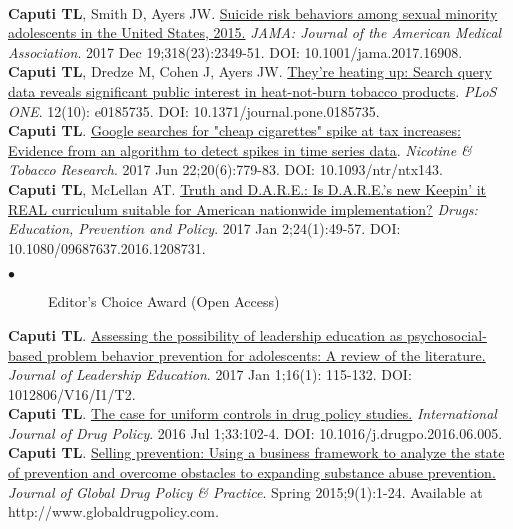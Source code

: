 \documentclass[11pt, letterpaper]{article}
\newcommand{\years}[1]{\marginnote{\normalsize #1}}
\begin{document}
\\[.2cm]
\years{2017}\textbf{Caputi TL}, Smith D, Ayers JW.
\href{http://dx.doi.org/10.1001/jama.2017.16908}{Suicide risk behaviors among sexual minority adolescents in the United States, 2015.} \emph{JAMA: Journal of the American Medical Association}.  2017 Dec 19;318(23):2349-51. DOI: 10.1001/jama.2017.16908.\\[.2cm]
\years{2017}\textbf{Caputi TL}, Dredze M, Cohen J, Ayers JW. \href{http://dx.doi.org/10.1371/journal.pone.0185735}{They’re heating up: Search query data reveals significant public interest in heat-not-burn tobacco products}. \emph{PLoS ONE}. 12(10): e0185735. DOI: 10.1371/journal.pone.0185735.\\[.2cm]
\years{2017}\textbf{Caputi TL}.  \href{http://dx.doi.org/10.1093/ntr/ntx143}{Google searches for "cheap cigarettes" spike at tax increases: Evidence from an algorithm to detect spikes in time series data}. \emph{Nicotine \& Tobacco Research}. 2017 Jun 22;20(6):779-83. DOI: 10.1093/ntr/ntx143.\\[.2cm]
\years{2017}\textbf{Caputi TL}, McLellan AT. \href{http://dx.doi.org/10.1080/09687637.2016.1208731}{Truth and D.A.R.E.: Is D.A.R.E.’s new Keepin’ it REAL curriculum suitable for American nationwide implementation?}  \textit{Drugs: Education, Prevention and Policy}. 2017 Jan 2;24(1):49-57. DOI: 10.1080/09687637.2016.1208731.
    \begin{description}
    \item[$\bullet$] Editor's Choice Award (Open Access)
    \end{description}
\years{2017}\textbf{Caputi TL}. \href{http://journalofleadershiped.org/attachments/article/479/0571_caputi.pdf}{Assessing the possibility of leadership education as psychosocial-based problem behavior prevention for adolescents: A review of the literature.} \textit{Journal of Leadership Education}. 2017 Jan 1;16(1): 115-132. DOI: 1012806/V16/I1/T2.\\[.2cm]
\years{2016}\textbf{Caputi TL}. \href{http://dx.doi.org/10.1016/j.drugpo.2016.06.005}{The case for uniform controls in drug policy studies.}  \textit{International Journal of Drug Policy}. 2016 Jul 1;33:102-4. DOI: 10.1016/j.drugpo.2016.06.005.\\[.2cm]
\years{2015}\textbf{Caputi TL}. \href{http://www.globaldrugpolicy.com}{Selling prevention: Using a business framework to analyze the state of prevention and overcome obstacles to expanding substance abuse prevention.} \textit{Journal of Global Drug Policy \& Practice}. Spring 2015;9(1):1-24. Available at http://www.globaldrugpolicy.com. \\[.2cm]
\end{document}
